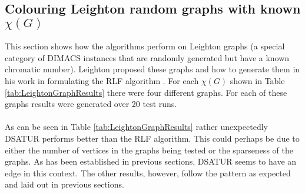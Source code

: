 \subsection{Colouring Leighton random graphs with known $\chi(G)$}
This section shows how the algorithms perform on Leighton graphs (a special category of DIMACS instances that are randomly generated but have a known chromatic number). Leighton proposed these graphs and how to generate them in his work in formulating the RLF algorithm \cite{Leighton1979AGC}. For each $\chi(G)$ shown in Table \ref{tab:LeightonGraphResults} there were four different graphs. For each of these graphs results were generated over 20 test runs.
\\\\
As can be seen in Table \ref{tab:LeightonGraphResults} rather unexpectedly DSATUR performs better than the RLF algorithm. This could perhaps be due to either the number of vertices in the graphs being tested or the sparseness of the graphs. As has been established in previous sections, DSATUR seems to have an edge in this context. The other results, however, follow the pattern as expected and laid out in previous sections. 

\begin{table}[H]
    \centering
    \caption{Average number of colours used by each algorithm on Leighton random graphs with known $\chi(G)$. The average $k$ is shown over 4 graphs per $\chi(G)$ and 20 test runs, along with the difference (excess colours used) from the $\chi(G)$.}
    \label{tab:LeightonGraphResults}
\end{table}


